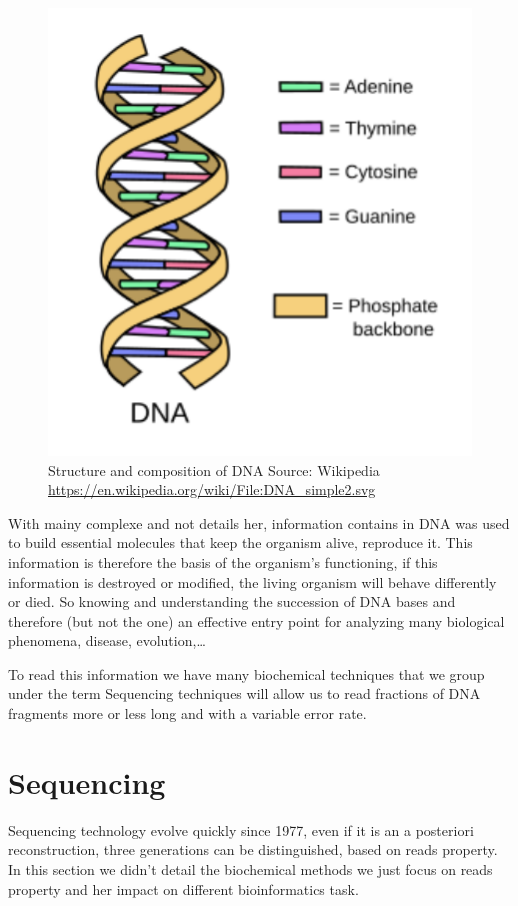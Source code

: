 \documentclass[./main.tex]{subfiles}
\begin{document}
\begin{figure}[ht]
    \centering
    \includegraphics[]{introduction/images/DNA.pdf}
    \caption{Structure and composition of DNA Source: Wikipedia \protect\url{https://en.wikipedia.org/wiki/File:DNA_simple2.svg}}
    \label{intro:fig:dna_rna_pres}
\end{figure}

With mainy complexe and not details her, information contains in DNA was used to build essential molecules that keep the organism alive, reproduce it. This information is therefore the basis of the organism's functioning, if this information is destroyed or modified, the living organism will behave differently or died. So knowing and understanding the succession of DNA bases and therefore (but not the one) an effective entry point for analyzing many biological phenomena, disease, evolution,…

To read this information we have many biochemical techniques that we group under the term Sequencing techniques will allow us to read fractions of DNA fragments more or less long and with a variable error rate.

\section{Sequencing}

Sequencing technology evolve quickly since 1977\cite{sanger_sequencing}, even if it is an a posteriori reconstruction, three generations can be distinguished, based on reads property. In this section we didn't detail the biochemical methods we just focus on reads property and her impact on different bioinformatics task.
\end{document}
